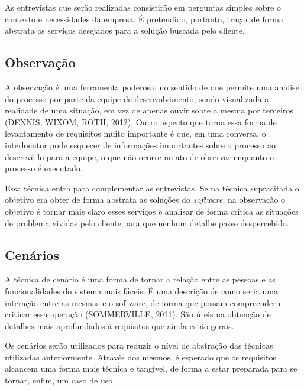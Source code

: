 As entrevistas que serão realizadas consistirão em perguntas simples sobre o contexto e necessidades da empresa. É pretendido, portanto, traçar de forma abstrata os serviços desejados para a solução buscada pelo cliente.

\subsection{Observação}

A observação é uma ferramenta poderosa, no sentido de que permite uma análise do processo por parte da equipe de desenvolvimento, sendo visualizada a realidade de uma situação, em vez de apenas ouvir sobre a mesma por terceiros (DENNIS, WIXOM, ROTH, 2012). Outro aspecto que torna essa forma de levantamento de requisitos muito importante é que, em uma conversa, o interlocutor pode esquecer de informações importantes sobre o processo ao descrevê-lo para a equipe, o que não ocorre no ato de observar enquanto o processo é executado.

Essa técnica entra para complementar as entrevistas. Se na técnica supracitada o objetivo era obter de forma abstrata as soluções do \textit{software}, na observação o objetivo é tornar mais claro esses serviços e analisar de forma crítica as situações de problema vividas pelo cliente para que nenhum detalhe passe despercebido.

\subsection{Cenários}

A técnica de cenário é uma forma de tornar a relação entre as pessoas e as funcionalidades do sistema mais fáceis. É uma descrição de como seria uma interação entre as mesmas e o software, de forma que possam compreender e criticar essa operação (SOMMERVILLE, 2011). São úteis na obtenção de detalhes mais aprofundados à requisitos que ainda estão gerais.

Os cenários serão utilizados para reduzir o nível de abstração das técnicas utilizadas anteriormente. Através dos mesmos, é esperado que os requisitos alcancem uma forma mais técnica e tangível, de forma a estar preparada para se tornar, enfim, um caso de uso.
